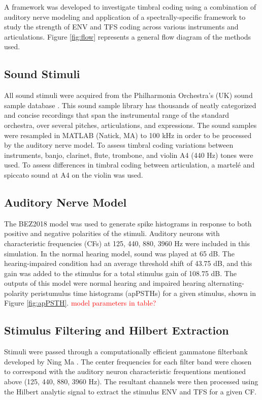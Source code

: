 \documentclass[conference]{IEEEtran}
\begin{document}
A framework was developed to investigate timbral coding using a combination of auditory nerve modeling and application of a spectrally-specific framework to study the strength of ENV and TFS coding across various instruments and articulations. Figure \ref{fig:flow} represents a general flow diagram of the methods used.


\subsection{Sound Stimuli}

All sound stimuli were acquired from the Philharmonia Orchestra's (UK) sound sample database \cite{noauthor_sound_nodate}. This sound sample library has thousands of neatly categorized and concise recordings that span the instrumental range of the standard orchestra, over several pitches, articulations, and expressions. The sound samples were resampled in MATLAB (Natick, MA) to 100 kHz in order to be processed by the auditory nerve model. To assess timbral coding variations between instruments, banjo, clarinet, flute, trombone, and violin A4 (440 Hz) tones were used. To assess differences in timbral coding between articulation, a martel\'{e} and spiccato sound at A4 on the violin was used. 

\subsection{Auditory Nerve Model}
The BEZ2018 model was used to generate spike histograms in response to both positive and negative polarities of the stimuli. Auditory neurons with characteristic frequencies (CFs) at 125, 440, 880, 3960 Hz were included in this simulation. In the normal hearing model, sound was played at 65 dB. The hearing-impaired condition had an average threshold shift of 43.75 dB, and this gain was added to the stimulus for a total stimulus gain of 108.75 dB. The outputs of this model were normal hearing and impaired hearing alternating-polarity peristumulus time histograms (apPSTHs) for a given stimulus, shown in Figure \ref{fig:apPSTH}. \textcolor{red}{model parameters in table?}   

\subsection{Stimulus Filtering and Hilbert Extraction}

Stimuli were passed through a computationally efficient gammatone filterbank developed by Ning Ma \cite{ma_efficient_nodate}. The center frequencies for each filter band were chosen to correspond with the auditory neuron characteristic frequentions mentioned above (125, 440, 880, 3960 Hz). The resultant channels were then processed using the Hilbert analytic signal to extract the stimulus ENV and TFS for a given CF. 
\end{document}
